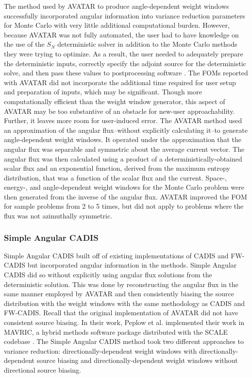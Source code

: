 The method used by AVATAR to produce angle-dependent weight windows successfully
incorporated angular information into variance reduction parameters for Monte Carlo
with very little additional computational burden. However, because AVATAR
was not fully automated, the user had to have knowledge on the use of the $S_N$
deterministic solver in addition to the Monte Carlo methods they were trying to
optimize. As a result, the user needed to adequately prepare the deterministic
inputs, correctly specify the adjoint source for the deterministic solve, and
then pass these values to postprocessing software \cite{peplow_consistent_2012,
evans_enhanced_1998}. The FOMs reported with AVATAR did not incorporate the
additional time required for user setup and preparation of inputs, which may be
significant. Though more computationally efficient than the weight window generator,
this aspect of AVATAR may be too substantive of an obstacle for new-user
approachability. Further, it leaves more room for user-induced error.
%
The AVATAR method
\cite{van_riper_generation_1995, van_riper_avatarautomatic_1997} used an
approximation of the angular flux--without explicitly calculating it--to
generate angle-dependent weight windows. It operated under the approximation
that
the angular flux was separable and symmetric about the average current vector.
The angular flux was then calculated using
a product of a deterministically-obtained
scalar flux and an exponential function, derived from the
maximum entropy distribution, that was a function of the scalar flux and the
current. Space-, energy-, and angle-dependent weight windows for
the Monte Carlo problem were then generated from the inverse of the angular
flux. AVATAR improved the FOM for sample problems from 2 to 5 times, but did not
apply to problems where the flux was not azimuthally symmetric.

%

\subsubsection{Simple Angular CADIS}

Simple Angular CADIS \cite{peplow_consistent_2012} built off of existing
implementations
of CADIS and FW-CADIS but incorporated angular information in the
methods. Simple Angular CADIS did so without explicitly using
angular flux solutions from the deterministic solution.
This was done by reconstructing the angular flux in the same manner employed by
AVATAR and then consistently
biasing the
source distribution with the weight windows with the same methodology as CADIS
and FW-CADIS. Recall that the original
implementation of AVATAR did not have consistent source biasing.
In their work, Peplow et al. implemented their
work in MAVRIC, a hybrid methods software package distributed with the SCALE
codebase \cite{SCALE6_1}. The Simple Angular CADIS method took two different
approaches to variance reduction:
directionally-dependent weight windows with directionally-dependent source
biasing and directionally-dependent weight windows without directional source
biasing.

